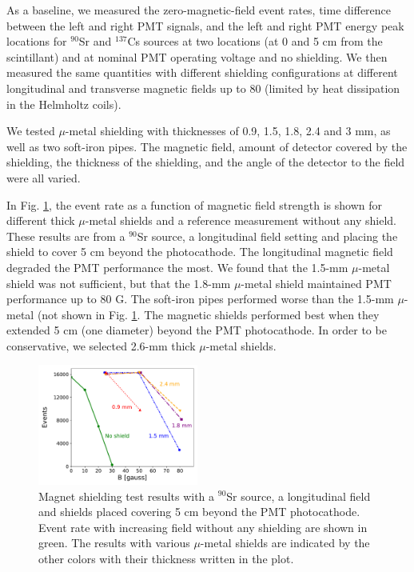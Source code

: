 \documentclass[3p,final,twocolumn]{elsarticle}
\begin{document}
  As a baseline, we measured the zero-magnetic-field 
event rates, time difference between the left and right PMT signals,
and the left and right PMT energy peak locations for $^{90}$Sr and
  $^{137}$Cs sources at two locations (at 0 and 5 \si{\centi\meter} from the scintillant) and  at nominal
  PMT operating voltage and no shielding.  We then measured the same quantities with different
  shielding configurations at different longitudinal and transverse
  magnetic fields up to 80 \si{\gauss} (limited by heat dissipation in the
  Helmholtz coils).

  We tested $\mu$-metal shielding with  thicknesses of 0.9, 1.5, 1.8,
  2.4 and 3 \si{\milli\meter}, as well as two soft-iron pipes. The magnetic field, amount of detector covered by the
  shielding, the thickness of the shielding, and the angle of the detector to the field were
  all varied.
  
In Fig. \ref{fig:shielding_results}, the event rate as a function of magnetic field strength is shown for different  thick $\mu$-metal shields and a reference measurement without any shield. These results are from a $^{90}$Sr source, a longitudinal field setting and placing the shield to cover 5 \si{\centi\meter} beyond the photocathode. 
The longitudinal magnetic field degraded the PMT performance
the most.  We found that the 1.5-\si{\milli\meter} $\mu$-metal shield was not
sufficient, but that the 1.8-\si{\milli\meter} $\mu$-metal shield maintained PMT
performance up to 80 G.  The soft-iron pipes performed worse than the
1.5-\si{\milli\meter} $\mu$-metal (not shown in Fig. \ref{fig:shielding_results}. The magnetic shields performed best when they
extended 5 \si{\centi\meter} (one diameter) beyond the PMT photocathode.  In order to
be conservative, we selected 2.6-mm thick $\mu$-metal shields.

\begin{figure}[tb]
	\centering
			\includegraphics[width=0.47\textwidth]{shielding_results.pdf}
	\caption{Magnet shielding test results with a $^{90}$Sr source, a longitudinal field and shields placed covering 5 \si{\centi\meter} beyond the PMT photocathode. Event rate with increasing field without any shielding are shown in green. The results with various $\mu$-metal shields are indicated by the other colors with their thickness written in the plot. }
	\label{fig:shielding_results}
\end{figure}
\end{document}
